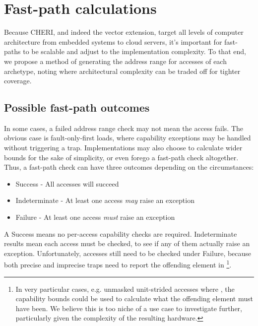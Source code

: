 \section{Fast-path calculations}
Because CHERI, and indeed the vector extension, target all levels of computer architecture from embedded systems to cloud servers, it's important for fast-paths to be scalable and adjust to the implementation complexity.
To that end, we propose a method of generating the address range for accesses of each archetype, noting where architectural complexity can be traded off for tighter coverage.

\subsection{Possible fast-path outcomes}
In some cases, a failed address range check may not mean the access fails.
The obvious case is fault-only-first loads, where capability exceptions may be handled without triggering a trap.
Implementations may also choose to calculate wider bounds for the sake of simplicity, or even forego a fast-path check altogether.
Thus, a fast-path check can have three outcomes depending on the circumstances:
\begin{itemize}
    \item Success - All accesses will succeed
    \item Indeterminate - At least one access \emph{may} raise an exception
    \item Failure - At least one access \emph{must} raise an exception
\end{itemize}


A Success means no per-access capability checks are required.
Indeterminate results mean each access must be checked, to see if any of them actually raise an exception.
Unfortunately, accesses still need to be checked under Failure, because both precise and imprecise traps need to report the offending element in \footnote{In very particular cases, e.g. unmasked unit-strided accesses where , the capability bounds could be used to calculate what the offending element must have been. We believe this is too niche of a use case to investigate further, particularly given the complexity of the resulting hardware.}.

